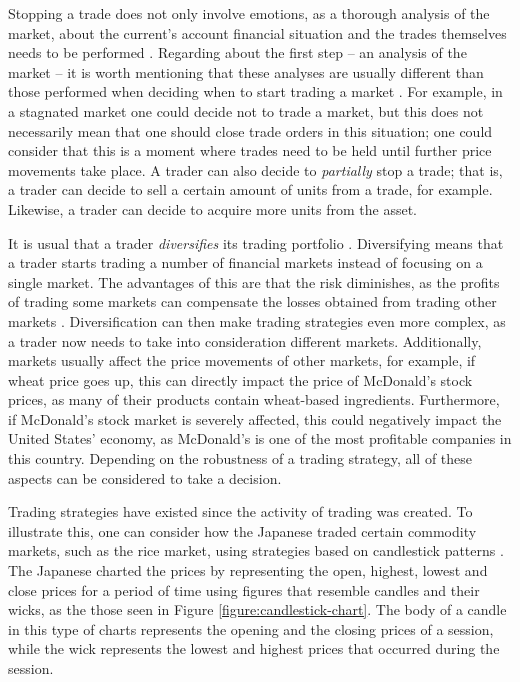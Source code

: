 Stopping a trade does not only involve emotions, as a thorough analysis of the
market, about the current's account financial situation and the trades
themselves needs to be performed \cite{Kadiri2015}. Regarding about the first
step -- an analysis of the market -- it is worth mentioning that these analyses
are usually different than those performed when deciding when to start trading a
market \cite{Conrad1998} \cite{Muller1997}. For example, in a stagnated market
one could decide not to trade a market, but this does not necessarily mean that
one should close trade orders in this situation; one could consider that this is
a moment where trades need to be held until further price movements take
place. A trader can also decide to \textit{partially} stop a trade; that is, a
trader can decide to sell a certain amount of units from a trade, for
example. Likewise, a trader can decide to acquire more units from the asset.

It is usual that a trader \textit{diversifies} its trading portfolio
\cite{Muller1997}. Diversifying means that a trader starts trading a number of
financial markets instead of focusing on a single market. The advantages of this
are that the risk diminishes, as the profits of trading some markets can
compensate the losses obtained from trading other markets
\cite{Muller1997}. Diversification can then make trading strategies even more
complex, as a trader now needs to take into consideration different
markets. Additionally, markets usually affect the price movements of other
markets, for example, if wheat price goes up, this can directly impact the price
of McDonald's stock prices, as many of their products contain wheat-based
ingredients. Furthermore, if McDonald's stock market is severely affected, this
could negatively impact the United States' economy, as McDonald's is one of the
most profitable companies in this country. Depending on the robustness of a
trading strategy, all of these aspects can be considered to take a decision.

Trading strategies have existed since the activity of trading was created.  To
illustrate this, one can consider how the Japanese traded certain commodity
markets, such as the rice market, using strategies based on candlestick patterns
\cite{Nison1991}. The Japanese charted the prices by representing the open,
highest, lowest and close prices for a period of time using figures that
resemble candles and their wicks, as the those seen in Figure
\ref{figure:candlestick-chart}. The body of a candle in this type of charts
represents the opening and the closing prices of a session, while the wick
represents the lowest and highest prices that occurred during the session.

